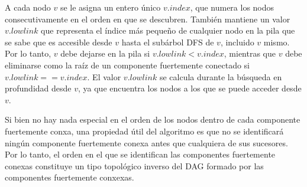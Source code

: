 A cada nodo $v$ se le asigna un entero único $v.index$, que numera los nodos consecutivamente en el orden en que se descubren. También mantiene un valor $v.lowlink$ que representa el índice más pequeño de cualquier nodo en la pila que se sabe que es accesible desde $v$ hasta el subárbol DFS de $v$, incluido $v$ mismo. Por lo tanto, $v$ debe dejarse en la pila si $v.lowlink < v.index$, mientras que $v$ debe eliminarse como la raíz de un componente fuertemente conectado si $v.lowlink == v.index$. El valor $v.lowlink$ se calcula durante la búsqueda en profundidad desde $v$, ya que encuentra los nodos a los que se puede acceder desde $v$.

Si bien no hay nada especial en el orden de los nodos dentro de cada componente fuertemente conxa, una propiedad útil del algoritmo es que no se identificará ningún componente fuertemente conexa antes que cualquiera de sus sucesores. Por lo tanto, el orden en el que se identifican las componentes fuertemente conexas constituye un tipo topológico inverso del DAG formado por las componentes fuertemente conxexas.